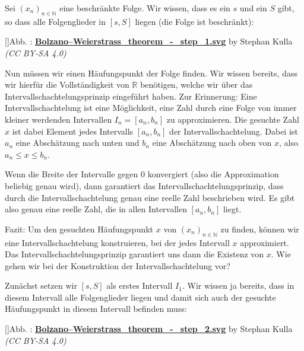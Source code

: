 \documentclass[fontsize=9pt,
               parskip=half-,
               DIV=14,
               listof=chapterentry,
               tocflat]{scrbook}
\newcounter{imagelabel}
\begin{document}
\begin{proof*}
Sei $(x_{n})_{n\in \mathbb {N} }$ eine beschränkte Folge. Wir wissen, dass es ein $s$ und ein $S$ gibt, so dass alle Folgenglieder in $[s,S]$ liegen (die Folge ist beschränkt):

[]{Abb. : \protect\href{https://commons.wikimedia.org/wiki/File:Bolzano–Weierstrass_theorem_-_step_1.svg}{\textbf{Bolzano–Weierstrass\allowbreak\_theorem\allowbreak\_\allowbreak-\allowbreak\_step\allowbreak\_1.svg}} by Stephan Kulla \textit{(CC BY-SA 4.0)}}\begin{center}
\end{center}

Nun müssen wir einen Häufungspunkt der Folge finden. Wir wissen bereits, dass wir hierfür die Vollständigkeit von $\mathbb {R} $ benötigen, welche wir über das Intervallschachtelungsprinzip eingeführt haben. Zur Erinnerung: Eine Intervallschachtelung ist eine Möglichkeit, eine Zahl durch eine Folge von immer kleiner werdenden Intervallen $I_{n}=[a_{n},b_{n}]$ zu approximieren. Die gesuchte Zahl $x$ ist dabei Element jedes Intervalls $[a_{n},b_{n}]$ der Intervallschachtelung. Dabei ist $a_{n}$ eine Abschätzung nach unten und $b_{n}$ eine Abschätzung nach oben von $x$, also $a_{n}\leq x\leq b_{n}$.

Wenn die Breite der Intervalle gegen $0$ konvergiert (also die Approximation beliebig genau wird), dann garantiert das Intervallschachtelungsprinzip, dass durch die Intervallschachtelung genau eine reelle Zahl beschrieben wird. Es gibt also genau eine reelle Zahl, die in allen Intervallen $[a_{n},b_{n}]$ liegt.

Fazit: Um den gesuchten Häufungspunkt $x$ von $(x_{n})_{n\in \mathbb {N} }$ zu finden, können wir eine Intervallschachtelung konstruieren, bei der jedes Intervall $x$ approximiert. Das Intervallschachtelungsprinzip garantiert uns dann die Existenz von $x$. Wie gehen wir bei der Konstruktion der Intervallschachtelung vor?

Zunächst setzen wir $[s,S]$ als erstes Intervall $I_{1}$. Wir wissen ja bereits, dass in diesem Intervall alle Folgenglieder liegen und damit sich auch der gesuchte Häufungspunkt in diesem Intervall befinden muss:

[]{Abb. : \protect\href{https://commons.wikimedia.org/wiki/File:Bolzano–Weierstrass_theorem_-_step_2.svg}{\textbf{Bolzano–Weierstrass\allowbreak\_theorem\allowbreak\_\allowbreak-\allowbreak\_step\allowbreak\_2.svg}} by Stephan Kulla \textit{(CC BY-SA 4.0)}}\begin{center}
\end{center}


\end{proof*}
\end{document}
